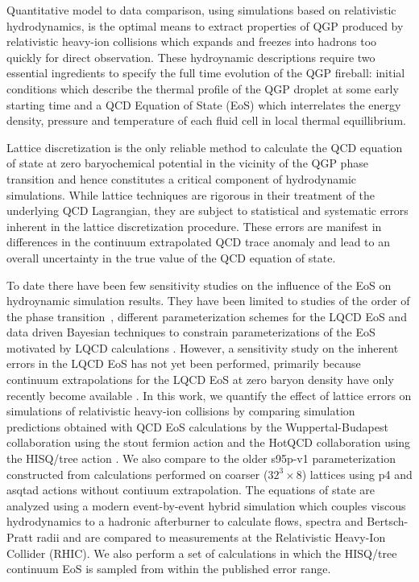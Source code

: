 \documentclass[aps,prc,reprint,amsmath,nofootinbib,superscriptaddress]{revtex4-1}
\begin{document}
Quantitative model to data comparison, using simulations based on relativistic hydrodynamics, is the optimal means to extract properties of QGP produced by relativistic heavy-ion collisions which expands and freezes into hadrons too quickly for direct observation. 
These hydroynamic descriptions require two essential ingredients to specify the full time evolution of the QGP fireball: initial conditions which describe the thermal profile of the QGP droplet at some early starting time and a QCD Equation of State (EoS) which interrelates the energy density, pressure and temperature of each fluid cell in local thermal equillibrium.

Lattice discretization is the only reliable method to calculate the QCD equation of state at zero baryochemical potential in the vicinity of the QGP phase transition and hence constitutes a critical component of hydrodynamic simulations. 
While lattice techniques are rigorous in their treatment of the underlying QCD Lagrangian, they are subject to statistical and systematic errors inherent in the lattice discretization procedure. 
These errors are manifest in differences in the continuum extrapolated QCD trace anomaly and lead to an overall uncertainty in the true value of the QCD equation of state.

To date there have been few sensitivity studies on the influence of the EoS on hydroynamic simulation results. 
They have been limited to studies of the order of the phase transition~\cite{Huovinen:2005gy}, different parameterization schemes for the LQCD EoS \cite{Huovinen:2009yb} and data driven Bayesian techniques to constrain parameterizations of the EoS motivated by LQCD calculations \cite{Pratt:2015zsa,Sangaline:2015isa}.
However, a sensitivity study on the inherent errors in the LQCD EoS has not yet been performed, primarily because continuum extrapolations for the LQCD EoS at zero baryon density have only recently become available \cite{Borsanyi:2013bia,Bazavov:2014pvz}. 
In this work, we quantify the effect of lattice errors on simulations of relativistic heavy-ion collisions by comparing simulation predictions obtained with QCD EoS calculations by the Wuppertal-Budapest collaboration using the stout fermion action \cite{Borsanyi:2013bia} and the HotQCD collaboration using the HISQ/tree action \cite{Bazavov:2014pvz}.  
We also compare to the older s95p-v1 parameterization \cite{Huovinen:2009yb} constructed from calculations performed on coarser ($32^3 \times 8$) lattices using p4 and asqtad actions without contiuum extrapolation.  
The equations of state are analyzed using a modern event-by-event hybrid simulation which couples viscous hydrodynamics to a hadronic afterburner to calculate flows, spectra and Bertsch-Pratt radii and are compared to measurements at the Relativistic Heavy-Ion Collider (RHIC).
We also perform a set of calculations in which the HISQ/tree continuum EoS is sampled from within the published error range.
\end{document}

